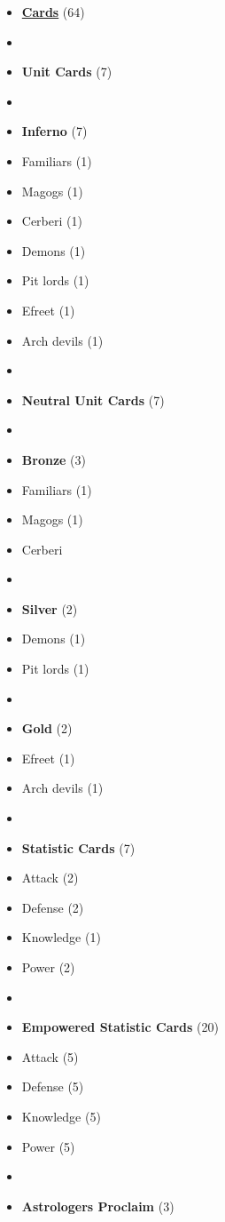 \begin{multicols*}{3}
\begin{itemize}[leftmargin=0pt, label={}, noitemsep, noitemsep]
  \item \textbf{\small{\underline{Cards}}} (64)
  \item
  \item \textbf{Unit Cards} (7)
  \item
  \item \textbf{Inferno} (7)
  \item Familiars (1)
  \item Magogs (1)
  \item Cerberi (1)
  \item Demons (1)
  \item Pit lords (1)
  \item Efreet (1)
  \item Arch devils (1)
  \item
  \item \textbf{Neutral Unit Cards} (7)
  \item
  \item \textbf{Bronze} (3)
  \item Familiars (1)
  \item Magogs (1)
  \item Cerberi
  \item
  \item \textbf{Silver} (2)
  \item Demons (1)
  \item Pit lords (1)
  \item
  \item \textbf{Gold} (2)
  \item Efreet (1)
  \item Arch devils (1)
  \item
  \item \textbf{Statistic Cards} (7)
  \item Attack (2)
  \item Defense (2)
  \item Knowledge (1)
  \item Power (2)
  \item
  \item \textbf{Empowered Statistic Cards} (20)
  \item Attack (5)
  \item Defense (5)
  \item Knowledge (5)
  \item Power (5)
  \item
  \item \textbf{Astrologers Proclaim} (3)

\end{itemize}
\end{multicols*}
